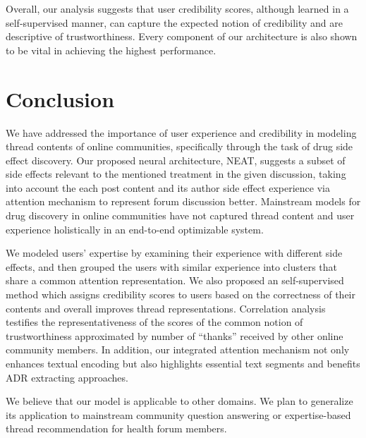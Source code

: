 \documentclass{bmcart}
\begin{document}
Overall, our analysis suggests that user credibility scores, although learned in a self-supervised manner, can capture the expected notion of credibility and are descriptive of trustworthiness. Every component of our architecture is also shown to be vital in achieving the highest performance.

\section{Conclusion}
We have addressed the importance of user experience and credibility in
modeling thread contents of online communities, specifically through
the task of drug side effect discovery. 
Our proposed neural architecture, NEAT, suggests a subset of side effects relevant to 
the mentioned treatment in the given discussion, 
taking into account the each post content and its
author side effect experience via attention mechanism to represent forum discussion better. Mainstream models for drug discovery in online communities have not captured thread content and user experience holistically in an end-to-end optimizable system.

We modeled users' expertise by examining their experience with different side effects, and then grouped the users with similar experience into clusters that
share a common attention representation. We also proposed an self-supervised method which assigns credibility scores to users based on the correctness of their contents and overall improves thread representations. Correlation analysis testifies the representativeness of the scores of the common notion of trustworthiness approximated by number of ``thanks'' received by other online community members. In addition, our integrated attention mechanism not only enhances textual encoding but also highlights essential text segments and benefits ADR extracting approaches.

We believe that our model is applicable to other domains. We plan to generalize its application to mainstream community question answering or expertise-based thread recommendation for health forum members.


\newpage
\end{document}
